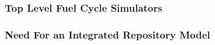 

\begin{frame}[ctb!]
  \frametitle{Top Level Fuel Cycle Simulators}
\end{frame}


\begin{frame}[ctb!]
  \frametitle{Need For an Integrated Repository Model}
\end{frame}
